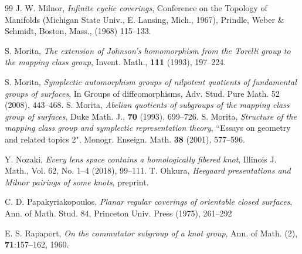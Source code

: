 \documentclass{article}
\theoremstyle{plain}
\theoremstyle{definition}
\begin{document}
{\begin{thebibliography}{99}
 J. W. Milnor, {\it Infinite cyclic coverings}, Conference on the Topology of Manifolds (Michigan State Univ., E. Lansing, Mich., 1967), Prindle, Weber \& Schmidt, Boston, Mass., (1968) 115--133.


 S. Morita, {\it The extension of Johnson's homomorphism from the Torelli group to the mapping class group}, Invent. Math., {\bf 111} (1993), 197--224.


 S. Morita, {\it Symplectic automorphism groups of nilpotent quotients of fundamental groups of surfaces}, In Groups of diffeomorphisms, Adv. Stud. Pure Math.
52 (2008), 443--468.
 S. Morita, {\it Abelian quotients of subgroups of the mapping class group of
surfaces}, Duke Math. J., {\bf 70} (1993), 699--726.
 S. Morita, {\it Structure of the mapping class group and symplectic representation theory}, ``Essays on geometry and related topics 2", Monogr. Enseign. Math. {\bf 38} (2001), 577--596.




Y. Nozaki, {\it Every lens space contains a homologically fibered knot}, Illinois J. Math., Vol. 62, No. 1--4 (2018), 99--111.
 T. Ohkura, {\it Heegaard presentations and Milnor pairings of some knots}, preprint. %

C. D. Papakyriakopoulos, {\it Planar regular coverings of orientable closed surfaces},
Ann. of Math. Stud. 84, Princeton Univ. Press (1975), 261--292

E. S. Rapaport, {\it On the commutator subgroup of a knot group}, Ann. of Math. (2), {\bf 71}:157--162,
1960.


\end{thebibliography}}
\end{document}
